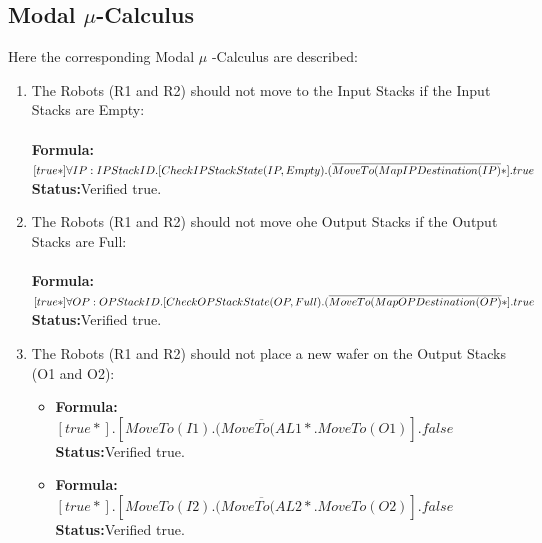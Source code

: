 \documentclass[a4paper,12pt]{article}
\begin{document}
\subsection{Modal $\mu$-Calculus}
Here the corresponding Modal $\mu$ -Calculus are described:
\begin{enumerate}

\item The Robots (R1 and R2) should not move to the Input Stacks if the Input Stacks are Empty:
\\
\\\textbf{Formula:} $[true*] \forall IP: IPStackID.[CheckIPStackState(IP, Empty).
\\(\overline{MoveTo(MapIPDestination(IP)}*].true$ \\\textbf{Status:}Verified true.


\item The Robots (R1 and R2) should not move ohe Output Stacks if the Output Stacks are Full:
\\
\\\textbf{Formula:} $[true*] \forall OP: OPStackID.[CheckOPStackState(OP, Full).
\\(\overline{MoveTo(MapOPDestination(OP)}*].true$ \\\textbf{Status:}Verified true.




\item The Robots (R1 and R2) should not place a new wafer on the Output Stacks (O1 and O2):
    \begin{itemize}
	\item \textbf{Formula:} $[true*].[MoveTo(I1).(\overline{MoveTo(AL1}*.MoveTo(O1)].false$ \\\textbf{Status:}Verified true.
    \item \textbf{Formula:} $[true*].[MoveTo(I2).(\overline{MoveTo(AL2}*.MoveTo(O2)].false$ \\\textbf{Status:}Verified true.
	\end{itemize}



\end{enumerate}
\end{document}
